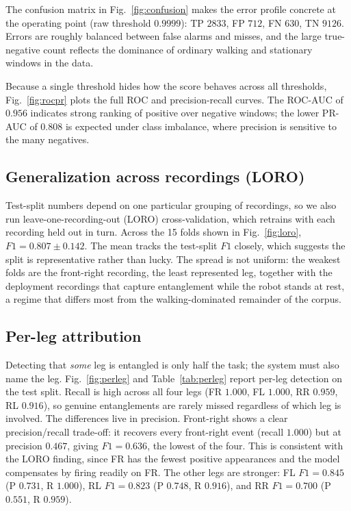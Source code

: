 \documentclass[conference]{IEEEtran}
\begin{document}
The confusion matrix in Fig.~\ref{fig:confusion} makes the error profile concrete at the operating point (raw threshold $0.9999$): TP $2833$, FP $712$, FN $630$, TN $9126$. Errors are roughly balanced between false alarms and misses, and the large true-negative count reflects the dominance of ordinary walking and stationary windows in the data.

Because a single threshold hides how the score behaves across all thresholds, Fig.~\ref{fig:rocpr} plots the full ROC and precision-recall curves. The ROC-AUC of $0.956$ indicates strong ranking of positive over negative windows; the lower PR-AUC of $0.808$ is expected under class imbalance, where precision is sensitive to the many negatives.

\subsection{Generalization across recordings (LORO)}
Test-split numbers depend on one particular grouping of recordings, so we also run leave-one-recording-out (LORO) cross-validation, which retrains with each recording held out in turn. Across the 15 folds shown in Fig.~\ref{fig:loro}, $F1 = 0.807 \pm 0.142$. The mean tracks the test-split $F1$ closely, which suggests the split is representative rather than lucky. The spread is not uniform: the weakest folds are the front-right recording, the least represented leg, together with the deployment recordings that capture entanglement while the robot stands at rest, a regime that differs most from the walking-dominated remainder of the corpus.

\subsection{Per-leg attribution}
Detecting that \emph{some} leg is entangled is only half the task; the system must also name the leg. Fig.~\ref{fig:perleg} and Table~\ref{tab:perleg} report per-leg detection on the test split. Recall is high across all four legs (FR $1.000$, FL $1.000$, RR $0.959$, RL $0.916$), so genuine entanglements are rarely missed regardless of which leg is involved. The differences live in precision. Front-right shows a clear precision/recall trade-off: it recovers every front-right event (recall $1.000$) but at precision $0.467$, giving $F1 = 0.636$, the lowest of the four. This is consistent with the LORO finding, since FR has the fewest positive appearances and the model compensates by firing readily on FR. The other legs are stronger: FL $F1 = 0.845$ (P $0.731$, R $1.000$), RL $F1 = 0.823$ (P $0.748$, R $0.916$), and RR $F1 = 0.700$ (P $0.551$, R $0.959$).
\end{document}
